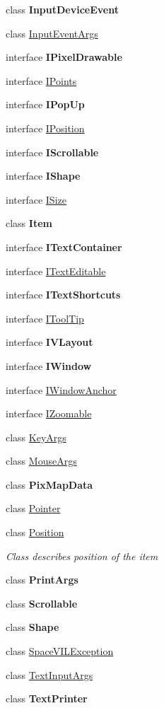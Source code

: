 \begin{DoxyCompactItemize}
\item 
class {\bfseries Input\+Device\+Event}
\item 
class \mbox{\hyperlink{class_space_v_i_l_1_1_core_1_1_input_event_args}{Input\+Event\+Args}}
\item 
interface {\bfseries I\+Pixel\+Drawable}
\item 
interface \mbox{\hyperlink{interface_space_v_i_l_1_1_core_1_1_i_points}{I\+Points}}
\item 
interface {\bfseries I\+Pop\+Up}
\item 
interface \mbox{\hyperlink{interface_space_v_i_l_1_1_core_1_1_i_position}{I\+Position}}
\item 
interface {\bfseries I\+Scrollable}
\item 
interface {\bfseries I\+Shape}
\item 
interface \mbox{\hyperlink{interface_space_v_i_l_1_1_core_1_1_i_size}{I\+Size}}
\item 
class {\bfseries Item}
\item 
interface {\bfseries I\+Text\+Container}
\item 
interface \mbox{\hyperlink{interface_space_v_i_l_1_1_core_1_1_i_text_editable}{I\+Text\+Editable}}
\item 
interface {\bfseries I\+Text\+Shortcuts}
\item 
interface \mbox{\hyperlink{interface_space_v_i_l_1_1_core_1_1_i_tool_tip}{I\+Tool\+Tip}}
\item 
interface {\bfseries I\+V\+Layout}
\item 
interface {\bfseries I\+Window}
\item 
interface \mbox{\hyperlink{interface_space_v_i_l_1_1_core_1_1_i_window_anchor}{I\+Window\+Anchor}}
\item 
interface \mbox{\hyperlink{interface_space_v_i_l_1_1_core_1_1_i_zoomable}{I\+Zoomable}}
\item 
class \mbox{\hyperlink{class_space_v_i_l_1_1_core_1_1_key_args}{Key\+Args}}
\item 
class \mbox{\hyperlink{class_space_v_i_l_1_1_core_1_1_mouse_args}{Mouse\+Args}}
\item 
class {\bfseries Pix\+Map\+Data}
\item 
class \mbox{\hyperlink{class_space_v_i_l_1_1_core_1_1_pointer}{Pointer}}
\item 
class \mbox{\hyperlink{class_space_v_i_l_1_1_core_1_1_position}{Position}}
\begin{DoxyCompactList}\small\item\em Class describes position of the item \end{DoxyCompactList}\item 
class {\bfseries Print\+Args}
\item 
class {\bfseries Scrollable}
\item 
class {\bfseries Shape}
\item 
class \mbox{\hyperlink{class_space_v_i_l_1_1_core_1_1_space_v_i_l_exception}{Space\+V\+I\+L\+Exception}}
\item 
class \mbox{\hyperlink{class_space_v_i_l_1_1_core_1_1_text_input_args}{Text\+Input\+Args}}
\item 
class {\bfseries Text\+Printer}
\end{DoxyCompactItemize}
